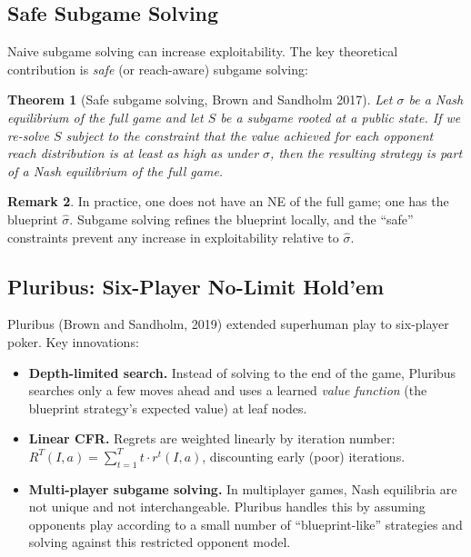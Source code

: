 \documentclass[11pt,a4paper]{article}
\theoremstyle{plain}
\newtheorem{theorem}{Theorem}[section]
\theoremstyle{definition}
\newtheorem{remark}[theorem]{Remark}
\begin{document}
\subsection{Safe Subgame Solving}

Naive subgame solving can increase exploitability.  The key theoretical
contribution is \emph{safe} (or reach-aware) subgame solving:

\begin{theorem}[Safe subgame solving, Brown and Sandholm 2017]
Let $\sigma$ be a Nash equilibrium of the full game and let $S$ be a
subgame rooted at a public state.  If we re-solve $S$ subject to the
constraint that the value achieved for each opponent reach distribution
is at least as high as under $\sigma$, then the resulting strategy is
part of a Nash equilibrium of the full game.
\end{theorem}

\begin{remark}
In practice, one does not have an NE of the full game; one has the
blueprint $\hat{\sigma}$.  Subgame solving refines the blueprint locally,
and the ``safe'' constraints prevent any increase in exploitability
relative to $\hat{\sigma}$.
\end{remark}

\subsection{Pluribus: Six-Player No-Limit Hold'em}

Pluribus (Brown and Sandholm, 2019) extended superhuman play to
six-player poker.  Key innovations:

\begin{itemize}
  \item \textbf{Depth-limited search.}  Instead of solving to the end of
    the game, Pluribus searches only a few moves ahead and uses a learned
    \emph{value function} (the blueprint strategy's expected value) at
    leaf nodes.
  \item \textbf{Linear CFR.}  Regrets are weighted linearly by iteration
    number: $R^T(I,a) = \sum_{t=1}^T t \cdot r^t(I,a)$, discounting
    early (poor) iterations.
  \item \textbf{Multi-player subgame solving.}  In multiplayer games,
    Nash equilibria are not unique and not interchangeable.  Pluribus
    handles this by assuming opponents play according to a small number
    of ``blueprint-like'' strategies and solving against this restricted
    opponent model.
\end{itemize}
\end{document}
